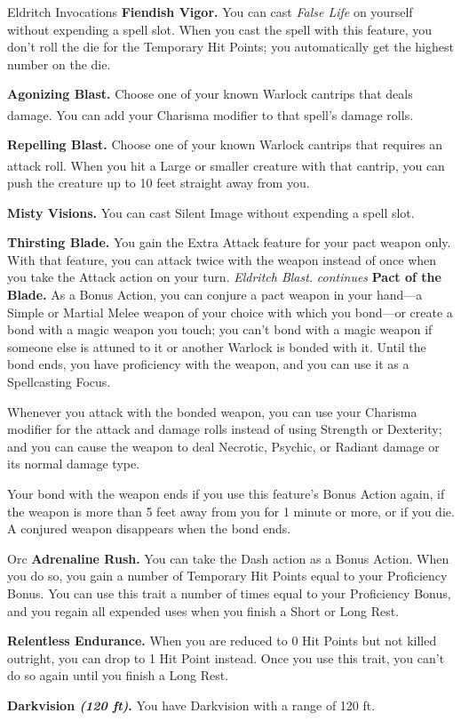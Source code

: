 \begin{Card}[Class]{Eldritch Invocations}
\textbf{Fiendish Vigor.} You can cast \textit{False Life} on yourself without expending a spell slot. When you cast the spell with this feature, you don't roll the die for the Temporary Hit Points; you automatically get the highest number on the die.

  \textbf{Agonizing Blast.} Choose one of your known Warlock cantrips that deals damage.\textsuperscript{\dag} You can add your Charisma modifier to that spell's damage rolls.

  \textbf{Repelling Blast.} Choose one of your known Warlock cantrips that requires an attack roll.\textsuperscript{\dag} When you hit a Large or smaller creature with that cantrip, you can push the creature up to 10 feet straight away from you.

\textbf{Misty Visions.} You can cast Silent Image without expending a spell slot.

\textbf{Thirsting Blade.} You gain the Extra Attack feature for your pact weapon only. With that feature, you can attack twice with the weapon instead of once when you take the Attack action on your turn.
\vfill {\footnotesize \dag\textit{Eldritch Blast.} \hfill \textit{continues}}
\newpage
{}
\textbf{Pact of the Blade.} As a Bonus Action, you can conjure a pact weapon in your hand—a Simple or Martial Melee weapon of your choice with which you bond—or create a bond with a magic weapon you touch; you can't bond with a magic weapon if someone else is attuned to it or another Warlock is bonded with it. Until the bond ends, you have proficiency with the weapon, and you can use it as a Spellcasting Focus.

Whenever you attack with the bonded weapon, you can use your Charisma modifier for the attack and damage rolls instead of using Strength or Dexterity; and you can cause the weapon to deal Necrotic, Psychic, or Radiant damage or its normal damage type.

Your bond with the weapon ends if you use this feature's Bonus Action again, if the weapon is more than 5 feet away from you for 1 minute or more, or if you die. A conjured weapon disappears when the bond ends.
\end{Card}


\begin{Card}[Species]{Orc}
\textbf{Adrenaline Rush.} You can take the Dash action as a Bonus Action. When you do so, you gain a number of Temporary Hit Points equal to your Proficiency Bonus. You can use this trait a number of times equal to your Proficiency Bonus, and you regain all expended uses when you finish a Short or Long Rest.

\textbf{Relentless Endurance.} When you are reduced to 0 Hit Points but not killed outright, you can drop to 1 Hit Point instead. Once you use this trait, you can't do so again until you finish a Long Rest.

\textbf{Darkvision \textit{(120 ft)}.} You have Darkvision with a range of 120 ft.
\end{Card}


